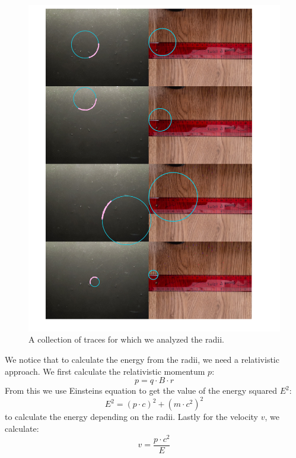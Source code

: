 \documentclass[10pt,a4paper]{article}
\begin{document}
\begin{figure}
    \centering
    \includegraphics[width=1\linewidth]{images/250330_CloudChamber_MagneticField_Radii.pdf}
    \caption{A collection of traces for which we analyzed the radii.}
    \label{fig:radii}
    \end{figure}

We notice that to calculate the energy from the radii, we need a relativistic approach. 
We first calculate the relativistic momentum \(p\): 
\begin{equation}
    \label{eqn:momentum}
    p = q \cdot B \cdot r
\end{equation}
From this we use Einsteins equation to get the value of the energy squared \(E^2\):
\begin{equation}
    \label{eqn:energy}
    E^2 = (p \cdot c)^2 + (m \cdot c^2)^2
\end{equation}
to calculate the energy depending on the radii. 
Lastly for the velocity \(v\), we calculate:
\begin{equation}
    \label{eqn:velocity}
    v = \frac{p \cdot c^2}{E}
\end{equation}
\end{document}
